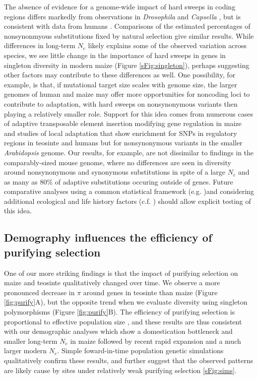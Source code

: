 \documentclass[12pt,a4paper]{article}
\begin{document}
The absence of evidence for a genome-wide impact of hard sweeps in coding regions differs markedly from observations in \emph{Drosophila} \cite{sattath2011} and \emph{Capsella} \cite{williamson2014}, but is consistent with data from humans \cite{hernandez2011,pritchard2010genetics}.
Comparisons of the estimated percentages of nonsynonmyous substitutions fixed by natural selection \cite{ross2009,sella2009,eyre2009estimating,williamson2014} give similar results. 
While differences in long-term $N_e$ likely explains some of the observed variation across species, we see little change in the importance of hard sweeps in genes in singleton diversity in modern maize (Figure \ref{sFig:singleton}), perhaps suggesting other factors may contribute to these differences as well.  
One possibility, for example, is that, if mutational target size scales with genome size, the larger genomes of human and maize may offer more opportunities for noncoding loci to contribute to adaptation, with hard sweeps on nonsynonymous variants then playing a relatively smaller role. 
Support for this idea comes from numerous cases of adaptive transposable element insertion modifying gene regulation in maize \cite{studer2011,castelletti2014mite,mao2015,yang2013} and studies of local adaptation that show enrichment for SNPs in regulatory regions in teosinte \cite{pyhajarvi2013} and humans \cite{fraser2013gene} but for nonsynonymous variants in the smaller \emph{Arabidopsis} genome.  
Our results, for example, are not dissimilar to findings in the comparably-sized mouse genome, where no differences are seen in diversity around nonsynonymous and synonymous substitutions in spite of a large $N_e$ and  as many as 80\% of adaptive substitutions occuring outside of genes\cite{Halligan:2013ir}.
Future comparative analyses using a common statistical framework (e.g. \cite{corbett2015} )and considering additional ecological and life history factors (c.f. \cite{leffler2012}) should allow explicit testing of this idea.

\subsection*{Demography influences the efficiency of purifying selection} %
One of our more striking findings is that the impact of purifying selection on maize and teosinte qualitatively changed over time. 
We observe a more pronounced decrease in $\pi$ around genes in teosinte than maize (Figure \ref{fig:purify}A), but the opposite trend when we evaluate diversity using singleton polymorphisms (Figure \ref{fig:purify}B).
The efficiency of purifying selection is proportional to effective population size \cite{kimura1984}, and these results are thus consistent with our demographic analyses which show a domestication bottleneck and smaller long-term $N_e$ in maize \cite{eyre1998, tenaillon2004, wright2005, ross2009} followed by recent rapid expansion and a much larger modern $N_e$. 
Simple foward-in-time population genetic simulations qualitatively confirm these results, and further suggest that the observed patterns are likely cause by sites under relatively weak purifying selection \ref{sFig:sims}.
\end{document}
